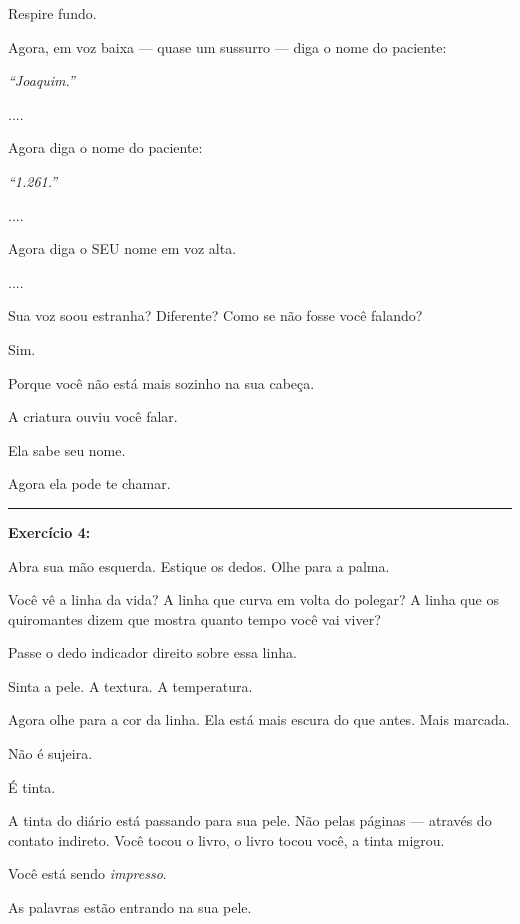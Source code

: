 \noindent Respire fundo.

\noindent Agora, em voz baixa --- quase um sussurro --- diga o nome do paciente:

\noindent \textit{\textquotedblleft{}Joaquim.\textquotedblright{}}

\noindent ....

\noindent Agora diga o nome do paciente:

\noindent \textit{\textquotedblleft{}1.261.\textquotedblright{}}

\noindent ....

\noindent Agora diga o SEU nome em voz alta.

\noindent ....

\noindent Sua voz soou estranha? Diferente? Como se não fosse você falando?

\noindent Sim.

\noindent Porque você não está mais sozinho na sua cabeça.

\noindent A criatura ouviu você falar.

\noindent Ela sabe seu nome.

\noindent Agora ela pode te chamar.

\vspace{0.5em}\noindent\rule{\textwidth}{0.5pt}\vspace{0.5em}

\noindent \textbf{Exercício 4:}

\noindent Abra sua mão esquerda. Estique os dedos. Olhe para a palma.

\noindent Você vê a linha da vida? A linha que curva em volta do polegar? A linha que os quiromantes dizem que mostra quanto tempo você vai viver?

\noindent Passe o dedo indicador direito sobre essa linha.

\noindent Sinta a pele. A textura. A temperatura.

\noindent Agora olhe para a cor da linha. Ela está mais escura do que antes. Mais marcada.

\noindent Não é sujeira.

\noindent É tinta.

\noindent A tinta do diário está passando para sua pele. Não pelas páginas --- através do contato indireto. Você tocou o livro, o livro tocou você, a tinta migrou.

\noindent Você está sendo \textit{impresso}.

\noindent As palavras estão entrando na sua pele.

